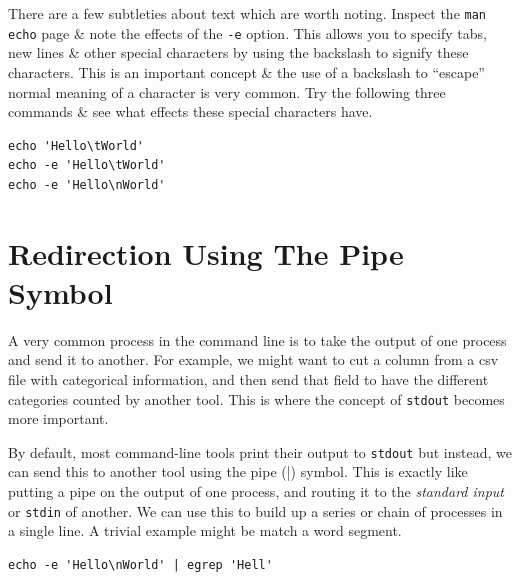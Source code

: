 \documentclass[a4paper,12pt,twoside]{memoir}
\begin{document}
\begin{information}
There are a few subtleties about text which are worth noting.
Inspect the \texttt{man echo} page \& note the effects of the \texttt{-e} option.
This allows you to specify tabs, new lines \& other special characters by using the backslash to signify these characters.
This is an important concept \& the use of a backslash to ``escape'' normal meaning of a character is very common.
Try the following three commands \& see what effects these special characters have.
\end{information}
\begin{steps}
\begin{lstlisting}
echo 'Hello\tWorld'
echo -e 'Hello\tWorld'
echo -e 'Hello\nWorld'
\end{lstlisting}
\end{steps}


\section{Redirection Using The Pipe Symbol}
\begin{information}
A very common process in the command line is to take the output of one process and send it to another.
For example, we might want to cut a column from a csv file with categorical information, and then send that field to have the different categories counted by another tool.
This is where the concept of \texttt{stdout} becomes more important. \\
\end{information}

\begin{steps}
By default, most command-line tools print their output to \texttt{stdout} but instead, we can send this to another tool using the pipe (|) symbol.
This is exactly like putting a pipe on the output of one process, and routing it to the \textit{standard input} or \texttt{stdin} of another.
We can use this to build up a series or chain of processes in a single line.
A trivial example might be match a word segment.
\begin{lstlisting}
echo -e 'Hello\nWorld' | egrep 'Hell'
\end{lstlisting}
\end{steps}
\end{document}
